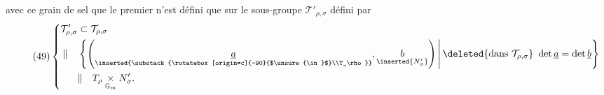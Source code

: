 avec ce grain de sel que le premier n'est défini que sur le sous-groupe $\mathcal T'_{\rho,\sigma}$ défini par
\[
\tag{49}
\left\{\begin{aligned}
\mathcal T'_{\rho,\sigma}&\subset\mathcal T_{\rho,\sigma}\\
\Vert\quad&\left\{\left(\underset{\inserted{\substack{\rotatebox[origin=c]{-90}{$\unsure{\in}$}\\T_\rho}}}{\underline a},\underset{\inserted{N'_\sigma}}{b}\right)\,\middle|\,\deleted{\text{dans }\mathcal T_{\rho,\sigma}}\ \det\underline a=\det\underline b\right\}\\
&\Vert\quad T_\rho\mathbin{\underset{\mathbb{G}_m}{\times}}N'_\sigma.
\end{aligned}\right.
\]

